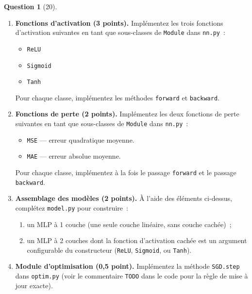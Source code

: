 \documentclass[12pt]{article}
\theoremstyle{definition}
\newtheorem{exercise}{Question}
\begin{document}
\begin{exercise}[20]
{\begin{enumerate}[label=\textbf{1.1.\arabic*}, leftmargin=*]
    \begin{enumerate}[label=(\alph*), nosep]
        \item Implémentez la méthode \texttt{forward}.
        \item Implémentez la méthode \texttt{backward}, qui retourne le gradient de la perte
        par rapport à l'entrée de la couche, et qui stocke les gradients par rapport à $W$
        et $b$.
    \end{enumerate}

    \item \textbf{Fonctions d'activation (3 points).} Implémentez les trois fonctions
    d'activation suivantes en tant que sous-classes de \texttt{Module} dans \texttt{nn.py}~:
    \begin{itemize}[nosep]
        \item \texttt{ReLU}
        \item \texttt{Sigmoid}
        \item \texttt{Tanh}
    \end{itemize}
    Pour chaque classe, implémentez les méthodes  \texttt{forward} et 
    \texttt{backward}.

    \item \textbf{Fonctions de perte (2 points).} Implémentez les deux fonctions de perte
    suivantes en tant que sous-classes de \texttt{Module} dans \texttt{nn.py}~:
    \begin{itemize}[nosep]
        \item \texttt{MSE} --- erreur quadratique moyenne.
        \item \texttt{MAE} --- erreur absolue moyenne.
    \end{itemize}
    Pour chaque classe, implémentez à la fois le passage \texttt{forward} et le passage
    \texttt{backward}.

    \item \textbf{Assemblage des modèles (2 points).} À l'aide des éléments ci-dessus,
    complétez \texttt{model.py} pour construire~:
    \begin{enumerate}[label=(\alph*), nosep]
        \item un MLP à 1 couche (une seule couche linéaire, sans couche cachée)~;
        \item un MLP à 2 couches dont la fonction d'activation cachée est un argument
        configurable du constructeur (\texttt{ReLU}, \texttt{Sigmoid}, ou \texttt{Tanh}).
    \end{enumerate}

    \item \textbf{Module d'optimisation (0,5 point).} Implémentez la méthode \texttt{SGD.step}
    dans \texttt{optim.py} (voir le commentaire \texttt{TODO} dans le code pour la règle de
    mise à jour exacte).


\end{enumerate}}
\end{exercise}
\end{document}
